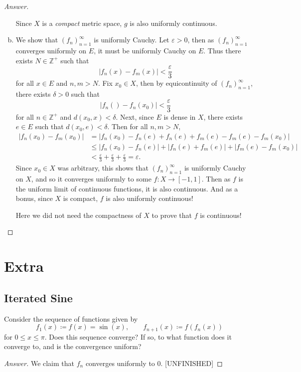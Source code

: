 \documentclass[12pt]{article}
\newcommand{\z}{\mathbb{Z}}
\newcommand{\ita}[1]{\textit{#1}}
\newcommand\paren[1]{\left( #1 \right)}
\newcommand{\abs}[1]{\left | #1 \right |}
\newcommand{\eps}{\varepsilon}
\theoremstyle{definition}
\begin{document}
\begin{proof}[Answer]
\begin{enumerate}[(a)]
        Since $X$ is a \ita{compact} metric space, $g$ is also uniformly continuous. 
        \item We show that $\paren{ f_n }_{n = 1}^{\infty}$ is uniformly Cauchy. Let $\eps > 0$, then as $\paren{ f_n }_{n = 1}^{\infty}$ converges uniformly on $E$, it must be uniformly Cauchy on $E$. Thus there exists $N \in \z^+$ such that 
        \[
            \abs{ f_n(x) - f_m(x) } < \frac{\eps}{3} 
        \]
        for all $x \in E$ and $n , m > N$. Fix $x_0 \in X$, then by equicontinuity of $\paren{ f_n }_{n = 1}^{\infty}$, there exists $\delta > 0$ such that 
        \[
            \abs{ f_n() - f_n \paren{ x_0 } } < \frac{\eps}{3} 
        \]
        for all $n \in \z^+$ and $d \paren{ x_0 , x } < \delta$. Next, since $E$ is dense in $X$, there exists $e \in E$ such that $d \paren{ x_0 , e } < \delta$. Then for all $n , m > N$, 
        \begin{align*}
            \abs{ f_n \paren{ x_0 } - f_{m} \paren{ x_0 } } & = \abs{ f_{n} \paren{ x_0 } - f_{n}(e) + f_{n}(e) + f_{m}(e) - f_{m}(e) - f_{m} \paren{ x_0 } } \\ 
            & \leq \abs{ f_{n} \paren{ x_0 } - f_{n}(e) } + \abs{ f_{n}(e) + f_{m}(e) } + \abs{ f_{m}(e) - f_{m} \paren{ x_0 } } \\ 
            & < \frac{\eps}{3} + \frac{\eps}{3} + \frac{\eps}{3} = \eps . 
        \end{align*}
        Since $x_0 \in X$ was arbitrary, this shows that $\paren{ f_n }_{n = 1}^{\infty}$ is uniformly Cauchy on $X$, and so it converges uniformly to some $f : X \to [-1,1]$. Then as $f$ is the uniform limit of continuous functions, it is also continuous. And as a bonus, since $X$ is compact, $f$ is also uniformly continuous!
        
        Here we did not need the compactness of $X$ to prove that $f$ is continuous!
    \end{enumerate}
\end{proof}

\newpage 
\section{Extra}
\subsection{Iterated Sine \texorpdfstring{\cite{Christian,Joel,Jeremy}}{}}
Consider the sequence of functions given by 
\[
    f_1(x) \coloneqq f(x) = \sin(x) , \qquad 
    f_{n+1}(x) \coloneqq f \paren{ f_n(x) } 
\]
for $0 \leq x \leq \pi$. Does this sequence converge? If so, to what function does it converge to, and is the convergence uniform?
\begin{proof}[Answer]
    We claim that $f_n$ converges uniformly to $0$. [UNFINISHED]
\end{proof}
\end{document}
